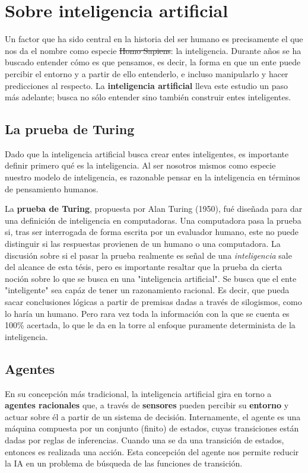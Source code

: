 \section{Sobre inteligencia artificial}
Un factor que ha sido central en la historia del ser humano es
precisamente el que nos da el nombre como especie \sout{Homo Sapiens}:
la inteligencia. Durante años se ha buscado entender cómo es que pensamos,
es decir, la forma en que un ente puede percibir el entorno y a partir
de ello entenderlo, e incluso manipularlo y hacer predicciones al respecto.
La \textbf{inteligencia artificial} lleva este estudio un paso más adelante;
busca no sólo entender sino también construir entes inteligentes.

\subsection{La prueba de Turing}
Dado que la inteligencia artificial busca crear entes inteligentes,
es importante definir primero qué es la inteligencia. Al ser nosotros
mismos como especie nuestro modelo de inteligencia, es razonable pensar
en la inteligencia en términos de pensamiento humanos.

La \textbf{prueba de Turing}, propuesta por Alan Turing (1950), fué diseñada
para dar una definición de inteligencia en computadoras. Una computadora pasa
la prueba si, tras ser interrogada de forma escrita por un evaluador humano,
este no puede distinguir si las respuestas provienen de un humano o una computadora.
La discusión sobre si el pasar la prueba realmente es señal de una \textit{inteligencia}
sale del alcance de esta tésis, pero es importante resaltar que la prueba da
cierta noción sobre lo que se busca en una "inteligencia artificial".
Se busca que el ente "inteligente" sea capáz de tener un razonamiento racional.
Es decir, que pueda sacar conclusiones lógicas a partir de premisas dadas a través
de silogismos, como lo haría un humano. Pero rara vez toda la información con la que
se cuenta es 100\% acertada, lo que le da en la torre al enfoque puramente
determinista de la inteligencia.

\subsection{Agentes}
En su concepción más tradicional, la inteligencia artificial gira en torno a
\textbf{agentes racionales} que, a través de \textbf{sensores} pueden percibir
su \textbf{entorno} y actuar sobre él a partir de un sistema de decisión.
Internamente, el agente es una máquina compuesta por un conjunto (finito) de estados,
cuyas transiciones están dadas por reglas de inferencias. Cuando una se da una
transición de estados, entonces es realizada una acción. Esta concepción del agente
nos permite reducir la IA en un problema de búsqueda de las funciones de transición.

